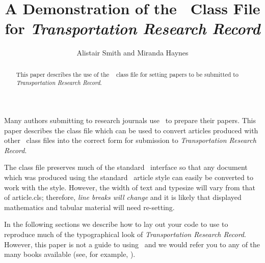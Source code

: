 \documentclass[times]{TRR}
\begin{document}

\title{A Demonstration of the \LaTeXe\ Class File for
\itshape{Transportation Research Record}}

\author{Alistair Smith and Miranda Haynes}



\begin{abstract}
This paper describes the use of the \LaTeXe\
\textsf{\journalclass} class file for setting papers to be
submitted to \textit{Transportation Research Record}.
\end{abstract}

\maketitle

\noindent Many authors submitting to research journals use \LaTeXe\ to
prepare their papers. This paper describes the
\textsf{\journalclass} class file which can be used to convert
articles produced with other \LaTeXe\ class files into the correct
form for submission to \textit{Transportation Research Record}.

The \textsf{\journalclass} class file preserves much of the
standard \LaTeXe\ interface so that any document which was
produced using the standard \LaTeXe\ \textsf{article} style can
easily be converted to work with the \textsf{\journalclassshort}
style. However, the width of text and typesize will vary from that
of \textsf{article.cls}; therefore, \textit{line breaks will change}
and it is likely that displayed mathematics and tabular material
will need re-setting.

In the following sections we describe how to lay out your code to
use \textsf{\journalclass} to reproduce much of the typographical look of
\textit{Transportation Research Record}. However, this paper is not a guide to
using \LaTeXe\ and we would refer you to any of the many books
available (see, for example, \cite{R1,R2,R3}).
\end{document}
